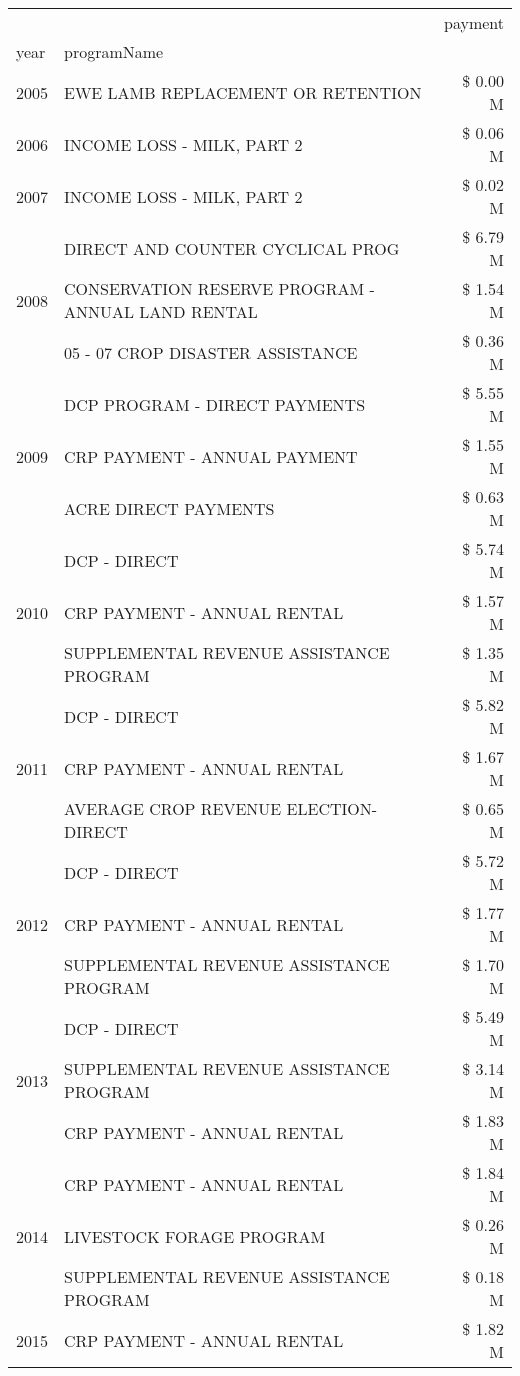 \begin{tabular}{llr}
\toprule
 &  & payment \\
year & programName &  \\
\midrule
2005 & EWE LAMB REPLACEMENT OR RETENTION & \$ 0.00 M \\
\cline{1-3}
2006 & INCOME LOSS - MILK, PART 2 & \$ 0.06 M \\
\cline{1-3}
2007 & INCOME LOSS - MILK, PART 2 & \$ 0.02 M \\
\cline{1-3}
\multirow[t]{3}{*}{2008} & DIRECT AND COUNTER CYCLICAL PROG & \$ 6.79 M \\
 & CONSERVATION RESERVE PROGRAM - ANNUAL LAND RENTAL & \$ 1.54 M \\
 & 05 - 07 CROP DISASTER ASSISTANCE & \$ 0.36 M \\
\cline{1-3}
\multirow[t]{3}{*}{2009} & DCP PROGRAM - DIRECT PAYMENTS & \$ 5.55 M \\
 & CRP PAYMENT - ANNUAL PAYMENT & \$ 1.55 M \\
 & ACRE DIRECT PAYMENTS & \$ 0.63 M \\
\cline{1-3}
\multirow[t]{3}{*}{2010} & DCP - DIRECT & \$ 5.74 M \\
 & CRP PAYMENT - ANNUAL RENTAL & \$ 1.57 M \\
 & SUPPLEMENTAL REVENUE ASSISTANCE PROGRAM & \$ 1.35 M \\
\cline{1-3}
\multirow[t]{3}{*}{2011} & DCP - DIRECT & \$ 5.82 M \\
 & CRP PAYMENT - ANNUAL RENTAL & \$ 1.67 M \\
 & AVERAGE CROP REVENUE ELECTION-DIRECT & \$ 0.65 M \\
\cline{1-3}
\multirow[t]{3}{*}{2012} & DCP - DIRECT & \$ 5.72 M \\
 & CRP PAYMENT - ANNUAL RENTAL & \$ 1.77 M \\
 & SUPPLEMENTAL REVENUE ASSISTANCE PROGRAM & \$ 1.70 M \\
\cline{1-3}
\multirow[t]{3}{*}{2013} & DCP - DIRECT & \$ 5.49 M \\
 & SUPPLEMENTAL REVENUE ASSISTANCE PROGRAM & \$ 3.14 M \\
 & CRP PAYMENT - ANNUAL RENTAL & \$ 1.83 M \\
\cline{1-3}
\multirow[t]{3}{*}{2014} & CRP PAYMENT - ANNUAL RENTAL & \$ 1.84 M \\
 & LIVESTOCK FORAGE PROGRAM & \$ 0.26 M \\
 & SUPPLEMENTAL REVENUE ASSISTANCE PROGRAM & \$ 0.18 M \\
\cline{1-3}
\multirow[t]{3}{*}{2015} & CRP PAYMENT - ANNUAL RENTAL & \$ 1.82 M \\

\end{tabular}
